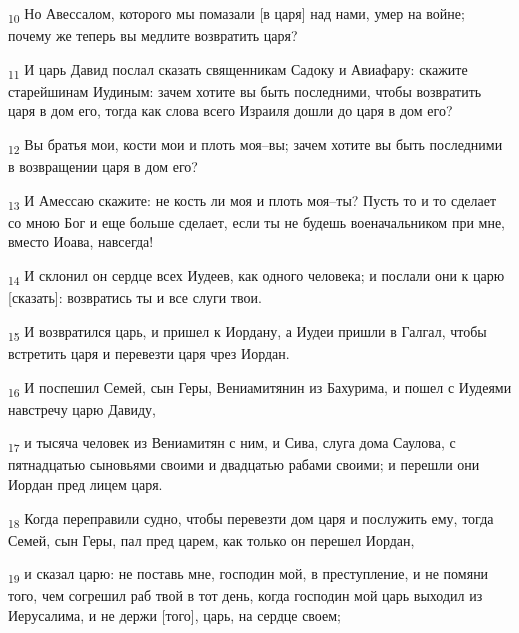 \begin{tcolorbox}
\textsubscript{10} Но Авессалом, которого мы помазали [в царя] над нами, умер на войне; почему же теперь вы медлите возвратить царя?
\end{tcolorbox}
\begin{tcolorbox}
\textsubscript{11} И царь Давид послал сказать священникам Садоку и Авиафару: скажите старейшинам Иудиным: зачем хотите вы быть последними, чтобы возвратить царя в дом его, тогда как слова всего Израиля дошли до царя в дом его?
\end{tcolorbox}
\begin{tcolorbox}
\textsubscript{12} Вы братья мои, кости мои и плоть моя--вы; зачем хотите вы быть последними в возвращении царя в дом его?
\end{tcolorbox}
\begin{tcolorbox}
\textsubscript{13} И Амессаю скажите: не кость ли моя и плоть моя--ты? Пусть то и то сделает со мною Бог и еще больше сделает, если ты не будешь военачальником при мне, вместо Иоава, навсегда!
\end{tcolorbox}
\begin{tcolorbox}
\textsubscript{14} И склонил он сердце всех Иудеев, как одного человека; и послали они к царю [сказать]: возвратись ты и все слуги твои.
\end{tcolorbox}
\begin{tcolorbox}
\textsubscript{15} И возвратился царь, и пришел к Иордану, а Иудеи пришли в Галгал, чтобы встретить царя и перевезти царя чрез Иордан.
\end{tcolorbox}
\begin{tcolorbox}
\textsubscript{16} И поспешил Семей, сын Геры, Вениамитянин из Бахурима, и пошел с Иудеями навстречу царю Давиду,
\end{tcolorbox}
\begin{tcolorbox}
\textsubscript{17} и тысяча человек из Вениамитян с ним, и Сива, слуга дома Саулова, с пятнадцатью сыновьями своими и двадцатью рабами своими; и перешли они Иордан пред лицем царя.
\end{tcolorbox}
\begin{tcolorbox}
\textsubscript{18} Когда переправили судно, чтобы перевезти дом царя и послужить ему, тогда Семей, сын Геры, пал пред царем, как только он перешел Иордан,
\end{tcolorbox}
\begin{tcolorbox}
\textsubscript{19} и сказал царю: не поставь мне, господин мой, в преступление, и не помяни того, чем согрешил раб твой в тот день, когда господин мой царь выходил из Иерусалима, и не держи [того], царь, на сердце своем;
\end{tcolorbox}
